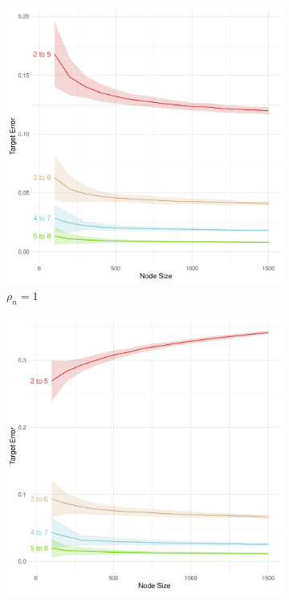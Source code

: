 \documentclass[10pt,journal,compsoc]{IEEEtran}
\numberwithin{equation}{section}
\begin{document}
\begin{figure}
\begin{subfigure}{.23\columnwidth}
\includegraphics[width=\columnwidth]{MR_d_3.pdf}%
\caption{$\rho_n = 1$}
\end{subfigure}\hfill
\begin{subfigure}{.23\columnwidth}
\includegraphics[width=\columnwidth]{MR_13_3.pdf}%

\end{subfigure}
\end{figure}
\end{document}
